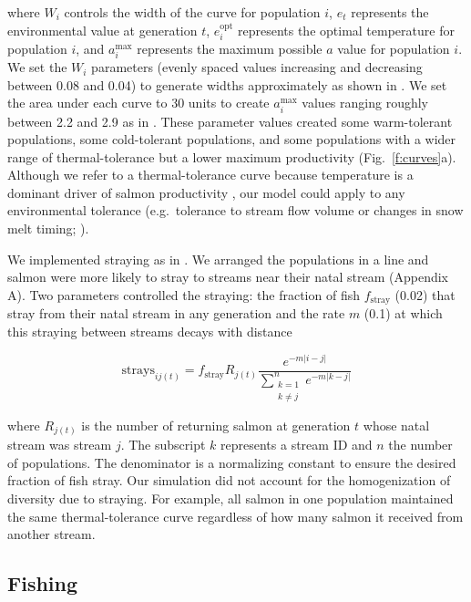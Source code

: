 \documentclass[12pt,english]{article}
\newcommand{\somstray}{Appendix A}
\begin{document}
\begin{spacing}{1.9}
\noindent
where $W_i$ controls the width of the curve for population $i$, $e_t$ represents the environmental value at generation $t$, $e_i^{\mathrm{opt}}$ represents the optimal temperature for population $i$, and $a_i^{\mathrm{max}}$ represents the maximum possible $a$ value for population $i$. We set the $W_i$ parameters (evenly spaced values increasing and decreasing between 0.08 and 0.04) to generate widths approximately as shown in \citet{eliason2011}. We set the area under each curve to 30 units to create $a_i^{\mathrm{max}}$ values ranging roughly between 2.2 and 2.9 as in \citet{dorner2008}. These parameter values created some warm-tolerant populations, some cold-tolerant populations, and some populations with a wider range of thermal-tolerance but a lower maximum productivity (Fig.~\ref{f:curves}a). Although we refer to a thermal-tolerance curve because temperature is a dominant driver of salmon productivity \citep[e.g.][]{mccullough1999, patterson2007, eliason2011}, our model could apply to any environmental tolerance (e.g.~tolerance to stream flow volume or changes in snow melt timing; \citeauthor{crozier2008} \citeyear{crozier2008}).

We implemented straying as in \citet{cooper1999}. We arranged the populations in a line and salmon were more likely to stray to streams near their natal stream (\somstray). Two parameters controlled the straying: the fraction of fish $f_{\mathrm{stray}}$ (0.02) that stray from their natal stream in any generation and the rate $m$ (0.1) at which this straying between streams decays with distance

\[\mathrm{strays}_{ij(t)} = f_{\mathrm{stray}} R_{j(t)} \frac{e^{-m \lvert i-j
\rvert }} {\displaystyle\sum\limits_{ \substack{k = 1 \\ k \neq j}}^{n} e^{-m
\lvert k-j \rvert }}\]

\noindent
where $R_{j(t)}$ is the number of returning salmon at generation $t$ whose natal stream was stream $j$. The subscript $k$ represents a stream ID and $n$ the number of populations. The denominator is a normalizing constant to ensure the desired fraction of fish stray. Our simulation did not account for the homogenization of diversity due to straying. For example, all salmon in one population maintained the same thermal-tolerance curve regardless of how many salmon it received from another stream.

\subsection{Fishing}\label{fishing}


\end{spacing}
\end{document}
